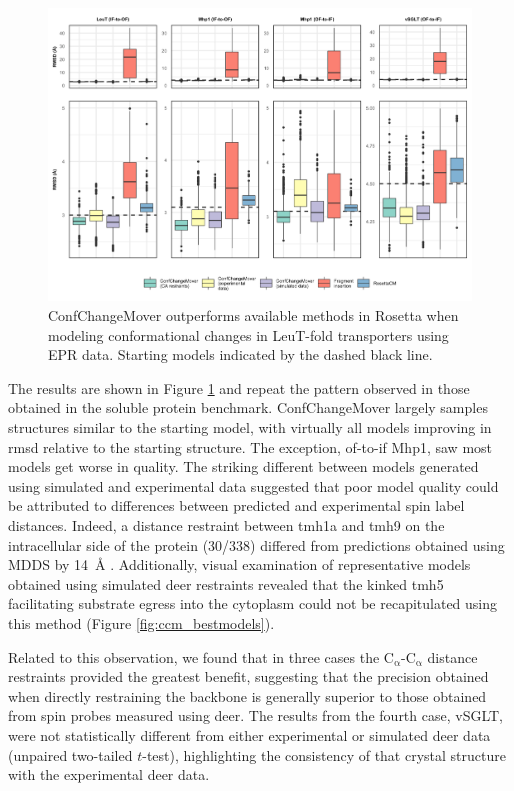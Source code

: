 \begin{figure}[h!]
\centering
\includegraphics[width=6.5in]{Figures/ccm_leut.pdf}
 \caption[ConfChangeMover outperforms available methods in Rosetta when modeling conformational changes in LeuT-fold transporters using EPR data.]{ConfChangeMover outperforms available methods in Rosetta when modeling conformational changes in LeuT-fold transporters using EPR data. Starting models indicated by the dashed black line.}
\label{fig:ccm_leut}
\end{figure}

The results are shown in Figure \ref{fig:ccm_leut} and repeat the pattern observed in those obtained in the soluble protein benchmark. ConfChangeMover largely samples structures similar to the starting model, with virtually all models improving in \gls{rmsd} relative to the starting structure. The exception, \gls{of}-to-\gls{if} Mhp1, saw most models get worse in quality. The striking different between models generated using simulated and experimental data suggested that poor model quality could be attributed to differences between predicted and experimental spin label distances. Indeed, a distance restraint between \gls{tmh}1a and \gls{tmh}9 on the intracellular side of the protein (30/338) differed from predictions obtained using MDDS by \SI{14}{\angstrom} \citep*{Kazmier2014}. Additionally, visual examination of representative models obtained using simulated \gls{deer} restraints revealed that the kinked \gls{tmh}5 facilitating substrate egress into the cytoplasm could not be recapitulated using this method (Figure \ref{fig:ccm_bestmodels}). 

Related to this observation, we found that in three cases the $\mathrm{C_{\upalpha}}$-$\mathrm{C_{\upalpha}}$ distance restraints provided the greatest benefit, suggesting that the precision obtained when directly restraining the backbone is generally superior to those obtained from spin probes measured using \gls{deer}. The results from the fourth case, vSGLT, were not statistically different from either experimental or simulated \gls{deer} data (unpaired two-tailed $t$-test), highlighting the consistency of that crystal structure with the experimental \gls{deer} data.

